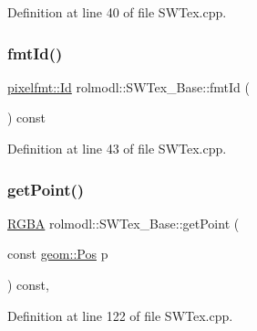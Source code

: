 Definition at line 40 of file S\+W\+Tex.\+cpp.

\mbox{\label{classrolmodl_1_1_s_w_tex___base_a81c2b5ec2118d474d747c7a20bf466e0}} 
\subsubsection{\texorpdfstring{fmtId()}{fmtId()}\hspace{0.1cm}{\footnotesize\ttfamily [2/2]}}
{\footnotesize\ttfamily \mbox{\hyperlink{namespacerolmodl_1_1pixelfmt_a96282713e4465ba9211c8fd3a702b52b}{pixelfmt\+::\+Id}} rolmodl\+::\+S\+W\+Tex\+\_\+\+Base\+::fmt\+Id (\begin{DoxyParamCaption}{ }\end{DoxyParamCaption}) const\hspace{0.3cm}{\ttfamily [noexcept]}}



Definition at line 43 of file S\+W\+Tex.\+cpp.

\mbox{\label{classrolmodl_1_1_s_w_tex___base_a86408f0070ab0703c06825ace24ac883}} 
\subsubsection{\texorpdfstring{getPoint()}{getPoint()}}
{\footnotesize\ttfamily \mbox{\hyperlink{structrolmodl_1_1_r_g_b_a}{R\+G\+BA}} rolmodl\+::\+S\+W\+Tex\+\_\+\+Base\+::get\+Point (\begin{DoxyParamCaption}\item[{const \mbox{\hyperlink{structrolmodl_1_1geom_1_1_pos}{geom\+::\+Pos}}}]{p }\end{DoxyParamCaption}) const\hspace{0.3cm}{\ttfamily [protected]}, {\ttfamily [noexcept]}}



Definition at line 122 of file S\+W\+Tex.\+cpp.

\mbox{\label{classrolmodl_1_1_s_w_tex___base_a7672866450cb7dc115412e8b19f5ff47}} 
